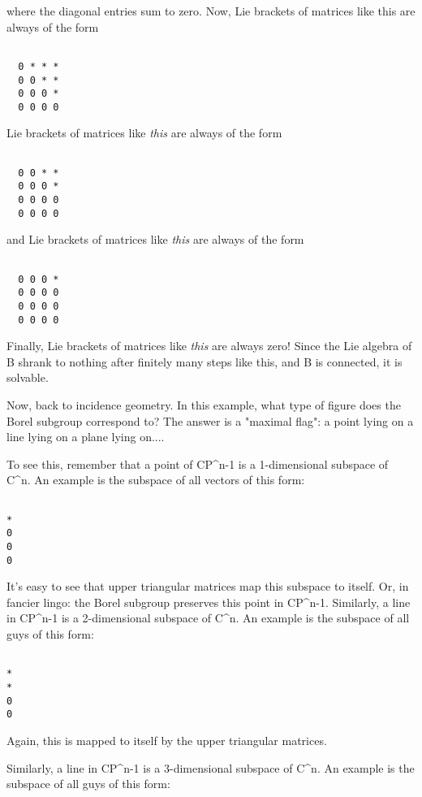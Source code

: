 where the diagonal entries sum to zero.  Now, Lie brackets of matrices 
like this are always of the form


\begin{verbatim}

  0 * * *
  0 0 * *
  0 0 0 *
  0 0 0 0
\end{verbatim}
    
Lie brackets of matrices like \emph{this} are always of the form


\begin{verbatim}

  0 0 * *
  0 0 0 *
  0 0 0 0
  0 0 0 0
\end{verbatim}
    
and Lie brackets of matrices like \emph{this} are always of the form


\begin{verbatim}

  0 0 0 *
  0 0 0 0
  0 0 0 0
  0 0 0 0
\end{verbatim}
    
Finally, Lie brackets of matrices like \emph{this} are always zero!
Since the Lie algebra of B shrank to nothing after finitely many steps
like this, and B is connected, it is solvable.


Now, back to incidence geometry.  In this example, what type of figure
does the Borel subgroup correspond to?  The answer is a "maximal
flag": a point lying on a line lying on a plane lying on....

To see this, remember that a point of CP^{n-1} is a 1-dimensional
subspace of C^{n}.  An example is the subspace of all vectors of this
form:


\begin{verbatim}

*
0
0
0
\end{verbatim}
    
It's easy to see that upper triangular matrices map this subspace
to itself.  Or, in fancier lingo: the Borel subgroup preserves 
this point in CP^{n-1}.  
Similarly, a line in CP^{n-1} is a 2-dimensional subspace of
C^{n}.  An example is the subspace of all guys of this form:


\begin{verbatim}

*
*
0
0
\end{verbatim}
    
Again, this is mapped to itself by the upper triangular matrices.

Similarly, a line in CP^{n-1} is a 3-dimensional subspace of
C^{n}.  An example is the subspace of all guys of this form:


